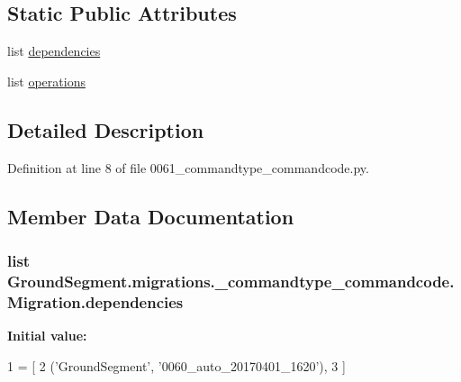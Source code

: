 \subsection*{Static Public Attributes}
\begin{DoxyCompactItemize}
\item 
list \hyperlink{class_ground_segment_1_1migrations_1_10061__commandtype__commandcode_1_1_migration_a1bce8eb0cdceb6a14320746404541f6f}{dependencies}
\item 
list \hyperlink{class_ground_segment_1_1migrations_1_10061__commandtype__commandcode_1_1_migration_a293d2c70fe9fd940cf4c6129babe8ef0}{operations}
\end{DoxyCompactItemize}


\subsection{Detailed Description}


Definition at line 8 of file 0061\+\_\+commandtype\+\_\+commandcode.\+py.



\subsection{Member Data Documentation}
\hypertarget{class_ground_segment_1_1migrations_1_10061__commandtype__commandcode_1_1_migration_a1bce8eb0cdceb6a14320746404541f6f}{}
\subsubsection[{dependencies}]{\setlength{\rightskip}{0pt plus 5cm}list Ground\+Segment.\+migrations.\+\_\+commandtype\+\_\+commandcode.\+Migration.\+dependencies\hspace{0.3cm}{\ttfamily [static]}}\label{class_ground_segment_1_1migrations_1_10061__commandtype__commandcode_1_1_migration_a1bce8eb0cdceb6a14320746404541f6f}
{\bfseries Initial value\+:}
\begin{DoxyCode}
1 = [
2         (\textcolor{stringliteral}{'GroundSegment'}, \textcolor{stringliteral}{'0060\_auto\_20170401\_1620'}),
3     ]
\end{DoxyCode}


